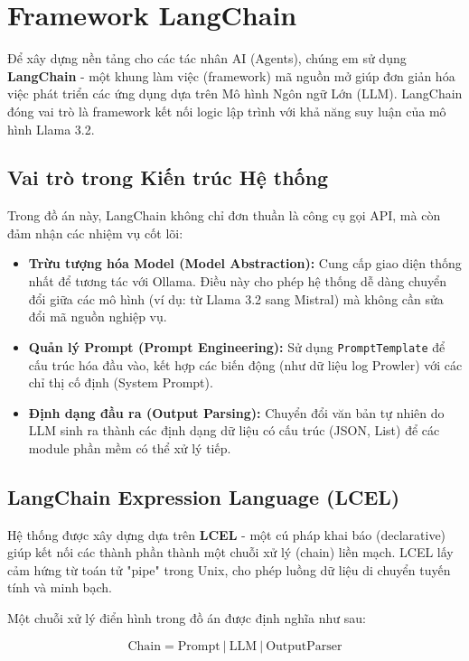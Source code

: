 \section{Framework LangChain}

Để xây dựng nền tảng cho các tác nhân AI (Agents), chúng em sử dụng \textbf{LangChain} - một khung làm việc (framework) mã nguồn mở giúp đơn giản hóa việc phát triển các ứng dụng dựa trên Mô hình Ngôn ngữ Lớn (LLM). LangChain đóng vai trò là framework kết nối logic lập trình với khả năng suy luận của mô hình Llama 3.2.

\subsection{Vai trò trong Kiến trúc Hệ thống}
Trong đồ án này, LangChain không chỉ đơn thuần là công cụ gọi API, mà còn đảm nhận các nhiệm vụ cốt lõi:
\begin{itemize}
    \item \textbf{Trừu tượng hóa Model (Model Abstraction):} Cung cấp giao diện thống nhất để tương tác với Ollama. Điều này cho phép hệ thống dễ dàng chuyển đổi giữa các mô hình (ví dụ: từ Llama 3.2 sang Mistral) mà không cần sửa đổi mã nguồn nghiệp vụ.
    \item \textbf{Quản lý Prompt (Prompt Engineering):} Sử dụng \texttt{PromptTemplate} để cấu trúc hóa đầu vào, kết hợp các biến động (như dữ liệu log Prowler) với các chỉ thị cố định (System Prompt).
    \item \textbf{Định dạng đầu ra (Output Parsing):} Chuyển đổi văn bản tự nhiên do LLM sinh ra thành các định dạng dữ liệu có cấu trúc (JSON, List) để các module phần mềm có thể xử lý tiếp.
\end{itemize}

\subsection{LangChain Expression Language (LCEL)}

Hệ thống được xây dựng dựa trên \textbf{LCEL} - một cú pháp khai báo (declarative) giúp kết nối các thành phần thành một chuỗi xử lý (chain) liền mạch. LCEL lấy cảm hứng từ toán tử "pipe" trong Unix, cho phép luồng dữ liệu di chuyển tuyến tính và minh bạch.

Một chuỗi xử lý điển hình trong đồ án được định nghĩa như sau:

\begin{equation}
    \text{Chain} = \text{Prompt} \: | \: \text{LLM} \: | \: \text{OutputParser}
\end{equation}

